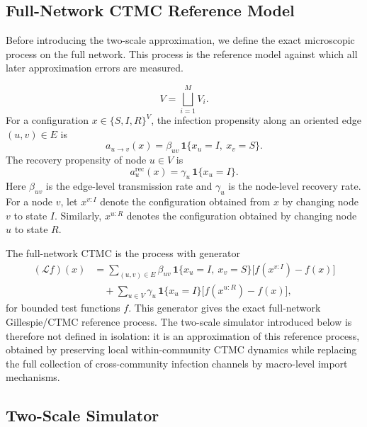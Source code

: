 \documentclass[a4paper,fleqn]{cas-sc}
\begin{document}
\subsection{Full-Network CTMC Reference Model}
\label{sec:full_network_ctmc_reference}

Before introducing the two-scale approximation, we define the exact microscopic process on the full network. This process is the reference model against which all later approximation errors are measured.

\[
V=\bigsqcup_{i=1}^{M} V_i .
\]
For a configuration \(x\in\{S,I,R\}^{V}\), the infection propensity along an oriented edge \((u,v)\in E\) is
\[
a_{u\to v}(x)
=\beta_{uv}\,\mathbf{1}\{x_u=I,\ x_v=S\}.
\]
The recovery propensity of node \(u\in V\) is
\[
a_u^{\mathrm{rec}}(x)
=\gamma_u\,\mathbf{1}\{x_u=I\}.
\]
Here \(\beta_{uv}\) is the edge-level transmission rate and \(\gamma_u\) is the node-level recovery rate. For a node \(v\), let \(x^{v:I}\) denote the configuration obtained from \(x\) by changing node \(v\) to state \(I\). Similarly, \(x^{u:R}\) denotes the configuration obtained by changing node \(u\) to state \(R\).

The full-network CTMC is the process with generator
\[
\begin{aligned}
(\mathcal L f)(x)
&=
\sum_{(u,v)\in E}
\beta_{uv}\,\mathbf{1}\{x_u=I,\ x_v=S\}
\bigl[f(x^{v:I})-f(x)\bigr]
\\
&\quad+
\sum_{u\in V}
\gamma_u\,\mathbf{1}\{x_u=I\}
\bigl[f(x^{u:R})-f(x)\bigr],
\end{aligned}
\]
for bounded test functions \(f\). This generator gives the exact full-network Gillespie/CTMC reference process. The two-scale simulator introduced below is therefore not defined in isolation: it is an approximation of this reference process, obtained by preserving local within-community CTMC dynamics while replacing the full collection of cross-community infection channels by macro-level import mechanisms.

\subsection{Two-Scale Simulator}
\label{sec:two_scale_simulator}
\end{document}

